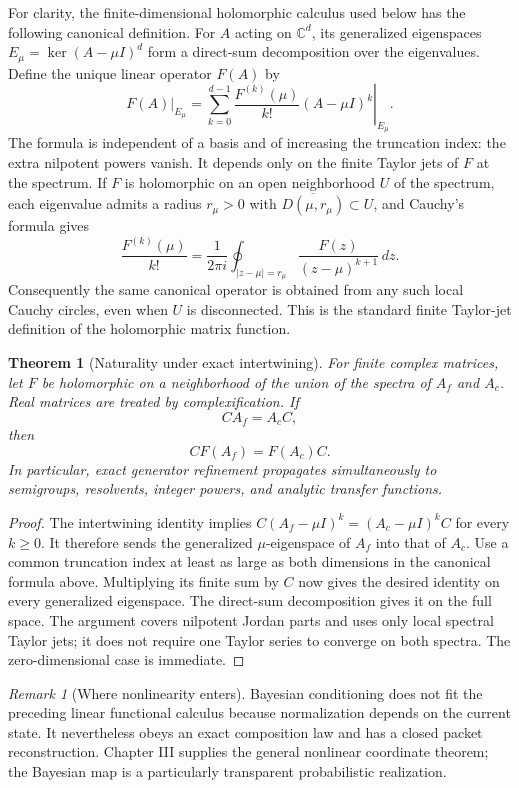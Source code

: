 \documentclass[11pt,letterpaper]{article}
\newtheorem{theorem}{Theorem}[section]
\theoremstyle{plain}
\theoremstyle{plain}
\theoremstyle{plain}
\theoremstyle{definition}
\theoremstyle{definition}
\theoremstyle{definition}
\theoremstyle{definition}
\theoremstyle{definition}
\theoremstyle{remark}
\theoremstyle{remark}
\newtheorem{remark}[remark]{Remark}
\theoremstyle{remark}
\theoremstyle{remark}
\theoremstyle{remark}
\theoremstyle{remark}
\let\KomorebiPrimitivemathbb\mathbb
\renewcommand{\mathbb}[1]{{\KomorebiPrimitivemathbb{#1}}}
\begin{document}
For clarity, the finite-dimensional holomorphic calculus used below has the
following canonical definition. For $A$ acting on $\mathbb C^d$, its generalized
eigenspaces $E_\mu=\ker(A-\mu I)^d$ form a direct-sum decomposition over the
eigenvalues. Define the unique linear operator $F(A)$ by
\[
\left.F(A)\right|_{E_\mu}
=\left.\sum_{k=0}^{d-1}\frac{F^{(k)}(\mu)}{k!}(A-\mu I)^k\right|_{E_\mu}.
\]
The formula is independent of a basis and of increasing the truncation index:
the extra nilpotent powers vanish. It depends only on the finite Taylor jets of
$F$ at the spectrum. If $F$ is holomorphic on an open neighborhood $U$ of the
spectrum, each eigenvalue admits a radius $r_\mu>0$ with
$\overline{D(\mu,r_\mu)}\subset U$, and Cauchy's formula gives
\[
\frac{F^{(k)}(\mu)}{k!}
=\frac{1}{2\pi i}\oint_{|z-\mu|=r_\mu}
  \frac{F(z)}{(z-\mu)^{k+1}}\,dz.
\]
Consequently the same canonical operator is obtained from any such local
Cauchy circles, even when $U$ is disconnected. This is the standard finite
Taylor-jet definition of the holomorphic matrix function.

\begin{theorem}[Naturality under exact intertwining]\label{core:record:044}
For finite complex matrices, let $F$ be holomorphic on a neighborhood of the union of the spectra of $A_f$ and $A_c$. Real matrices are treated by complexification. If
\[
CA_f=A_cC,
\]
then
\[
\boxed{CF(A_f)=F(A_c)C.}
\]
In particular, exact generator refinement propagates simultaneously to semigroups, resolvents, integer powers, and analytic transfer functions.
\end{theorem}

\begin{proof}
The intertwining identity implies
$C(A_f-\mu I)^k=(A_c-\mu I)^kC$ for every $k\ge0$.
It therefore sends the generalized $\mu$-eigenspace of $A_f$ into that of $A_c$.
Use a common truncation index at least as large as both dimensions in the
canonical formula above. Multiplying its finite sum by $C$ now gives the desired
identity on every generalized eigenspace. The direct-sum decomposition gives
it on the full space. The argument covers nilpotent Jordan parts and uses only
local spectral Taylor jets; it does not require one Taylor series to converge
on both spectra. The zero-dimensional case is immediate.
\end{proof}

\begin{remark}[Where nonlinearity enters]\label{core:record:045}
Bayesian conditioning does not fit the preceding linear functional calculus because normalization depends on the current state. It nevertheless obeys an exact composition law and has a closed packet reconstruction. Chapter III supplies the general nonlinear coordinate theorem; the Bayesian map is a particularly transparent probabilistic realization.
\end{remark}
\end{document}
